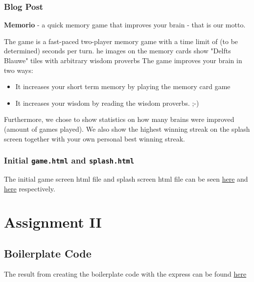 \documentclass{article}
\begin{document}
\subsubsection{Blog Post}
\textbf{Memorio} - a quick memory game that improves your brain - that is our motto.

The game is a fast-paced two-player memory game with a time limit of (to be determined) seconds per turn. he images on the memory cards show "Delfts Blauwe" tiles with arbitrary wisdom proverbs The game improves your brain in two ways:

\begin{itemize}
    \item It increases your short term memory by playing the memory card game
    \item It increases your wisdom by reading the wisdom proverbs. ;-)
\end{itemize}

Furthermore, we chose to show statistics on how many brains were improved (amount of games played). We also show the highest winning streak on the splash screen together with your own personal best winning streak.

\subsubsection{Initial \texttt{game.html} and \texttt{splash.html}}

The initial game screen html file and splash screen html file can be seen \href{https://github.com/mennohie/memory-project-webdb/blob/d7e7d1c3f0c67e9dbcf54ca13b5a8b2b9df77845/public/game.html}{here} and \href{https://github.com/mennohie/memory-project-webdb/blob/d7e7d1c3f0c67e9dbcf54ca13b5a8b2b9df77845/public/splash.html}{here} respectively.

\pagebreak

\section{Assignment II}

\subsection{Boilerplate Code}


The result from creating the boilerplate code with the express can be found \href{https://github.com/mennohie/memory-project-webdb/commit/0c1ac83a4d52c7b3378ce29ae22cf216194b26d4}{here} 
\end{document}
